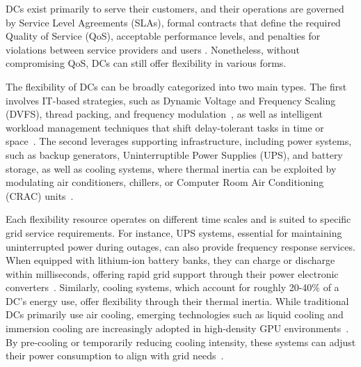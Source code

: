 \documentclass[preprint,12pt]{elsarticle}
\begin{document}
DCs exist primarily to serve their customers, and their operations are governed by Service Level Agreements (SLAs), formal contracts that define the required Quality of Service (QoS), acceptable performance levels, and penalties for violations between service providers and users \cite{arshad2022utilizing}. Nonetheless, without compromising QoS, DCs can still offer flexibility in various forms. 


The flexibility of DCs can be broadly categorized into two main types. The first involves IT-based strategies, such as Dynamic Voltage and Frequency Scaling (DVFS), thread packing, and frequency modulation~\cite{ZHANG2024DR}, as well as intelligent workload management techniques that shift delay-tolerant tasks in time or space~\cite{LIU2013770}. The second leverages supporting infrastructure, including power systems, such as backup generators, Uninterruptible Power Supplies (UPS), and battery storage, as well as cooling systems, where thermal inertia can be exploited by modulating air conditioners, chillers, or Computer Room Air Conditioning (CRAC) units~\cite{Takci2025}.

Each flexibility resource operates on different time scales and is suited to specific grid service requirements. For instance, UPS systems, essential for maintaining uninterrupted power during outages, can also provide frequency response services. When equipped with lithium-ion battery banks, they can charge or discharge within milliseconds, offering rapid grid support through their power electronic converters~\cite{Alapera2019,tomaszewska2019lithium}. Similarly, cooling systems, which account for roughly 20-40\% of a DC's energy use, offer flexibility through their thermal inertia. While traditional DCs primarily use air cooling, emerging technologies such as liquid cooling and immersion cooling are increasingly adopted in high-density GPU environments~\cite{crozier2025potential}. By pre-cooling or temporarily reducing cooling intensity, these systems can adjust their power consumption to align with grid needs~\cite{Cui2024, JerezMonsalves2023}.
\end{document}
